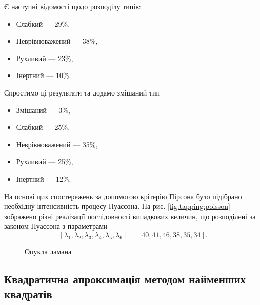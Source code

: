 Є наступні відомості щодо розподілу типів:
\begin{itemize}
  \item
    Слабкий --- 29\%,
  \item
    Неврівноважений --- 38\%,
  \item
    Рухливий --- 23\%,
  \item
    Інертний --- 10\%.
\end{itemize}
Спростимо ці результати та додамо змішаний тип
\begin{itemize}
  \item
    Змішаний --- 3\%,
  \item
    Слабкий --- 25\%,
  \item
    Неврівноважений --- 35\%,
  \item
    Рухливий --- 25\%,
  \item
    Інертний --- 12\%.
\end{itemize}
На основі цих спостережень за допомогою крітерію Пірсона
було підібрано необхідну інтенсивність процесу Пуассона.
На рис. \ref{fig:tapping:poisson} зображено різні реалізації послідовності
випадкових величин, що розподілені за законом Пуассона з параметрами
\begin{equation}\label{eq:tapping:poisson}
  \left[ \lambda_{1}, \lambda_{2}, \lambda_{3}, \lambda_{4}, \lambda_{5},
         \lambda_{6} \right]
  = \left[ 40, 41, 46, 38, 35, 34 \right].
\end{equation}

\begin{figure}[h]
  \centering
  \caption{Опукла ламана}
  \label{fig:tapping:Ilin01}
\end{figure}


\subsection{Квадратична апроксимація методом найменших квадратів}

